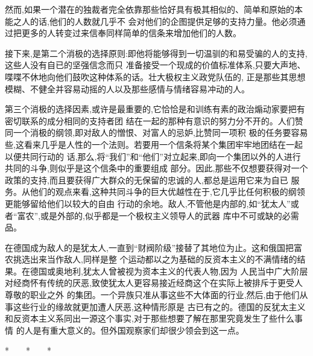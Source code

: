 ﻿\documentclass[12pt]{article}
\begin{document}
然而,如果一个潜在的独裁者完全依靠那些恰好具有极其相似的、简单和原始的本能之人的话,他们的人数就几乎不
会对他们的企图提供足够的支持力量。他必须通过把更多的人转变过来信奉同样简单的信条来增加他们的人数。

接下来,是第二个消极的选择原则:即他将能够得到一切温驯的和易受骗的人的支持,这些人没有自已的坚强信念而只
准备接受一个现成的价值标准体系,只要大声地、喋喋不休地向他们鼓吹这种体系的话。壮大极权主义政党队伍的,
正是那些其思想模糊、不健全并容易动摇的人以及那些感情与情绪容易冲动的人。

第三个消极的选择因素,或许是最重要的,它恰恰是和训练有素的政治煽动家要把有密切联系的成分相同的支持者团
结在一起的那种有意识的努力分不开的。人们赞同一个消极的纲领,即对敌人的憎恨、对富人的忌妒,比赞同一项积
极的任务要容易些,这看来几乎是人性的一个法则。若要用一个信条将某个集团牢牢地团结在一起以便共同行动的
话,那么,将``我们''和``他们''对立起来,即向一个集团以外的人进行共同的斗争,则似乎是这个信条中的重要组成
部分。因此,那些不仅想要获得对一个政策的支持,而且要获得广大群众的无保留的忠诚的人,都总是运用它来为自已
服务。从他们的观点来看,这种共同斗争的巨大优越性在于,它几乎比任何积极的纲领更能够留给他们以较大的自由
行动的余地。敌人,不管他是内部的,如``犹太人''或者``富农'',或是外部的,似乎都是一个极权主义领导人的武器
库中不可或缺的必需品。

在德国成为敌人的是犹太人,一直到``财阀阶级''接替了其地位为止。这和俄国把富农挑选出来当作敌人,同样是整
个运动都以之为基础的反资本主义的不满情绪的结果。在德国或奥地利,犹太人曾被视为资本主义的代表人物,因为
人民当中广大阶层对经商怀有传统的厌恶,致使犹太人更容易接近经商这个在实际上被排斥于更受人尊敬的职业之外
的集团。一个异族只准从事这些不大体面的行业,然后,由于他们从事这些行业的缘故就更加遭人厌恶,这种情形原是
古已有之的。德国的反犹太主义和反资本主义系同出一源这个事实,对于那些想要了解在那里究竟发生了些什么事情
的人是有重大意义的。但外国观察家们却很少领会到这一点。

*　　*　　*
\end{document}
